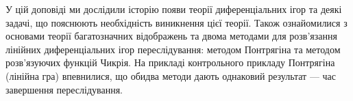 У цій доповіді ми дослідили історію появи теорії диференціальних ігор та деякі
задачі, що пояснюють необхідність виникнення цієї теорії. Також ознайомилися з основами теорії багатозначних відображень та
двома методами для розв'язання лінійних диференціальних ігор переслідування: методом Понтрягіна та
методом розв'язуючих функцій Чикрія. На прикладі контрольного прикладу Понтрягіна (лінійна гра)
впевнилися, що обидва методи дають однаковий результат --- час завершення переслідування.
